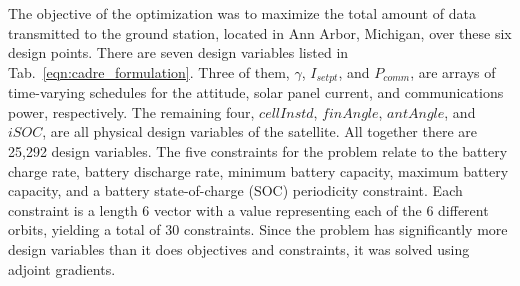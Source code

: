 \documentclass[]{aiaa-tc} %
\begin{document}
    The objective of the optimization was to maximize the total amount of data transmitted to the ground
    station, located in Ann Arbor, Michigan, over these six design points. There are seven design variables listed in Tab.~\ref{eqn:cadre_formulation}.
    Three of them, $\gamma$, $I_{setpt}$, and $P_{comm}$, are arrays of time-varying schedules for the attitude,
    solar panel current, and communications power, respectively. The remaining four, $cellInstd$, $finAngle$, $antAngle$, and $iSOC$,
    are all physical design variables of the satellite. All together there are 25,292 design variables.
    The five constraints for the problem relate to the battery charge rate, battery discharge rate,
    minimum battery capacity, maximum battery capacity, and a battery state-of-charge (SOC) periodicity
    constraint. Each constraint is a length 6 vector with a value representing each of the 6 different
    orbits, yielding a total of 30 constraints. Since the problem has significantly more design
    variables than it does objectives and constraints, it was solved using adjoint gradients.
\end{document}
